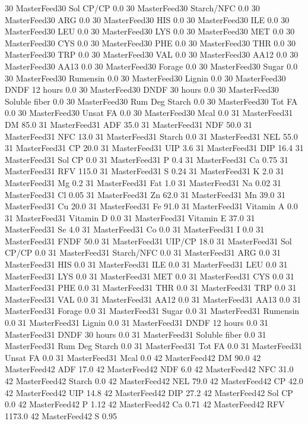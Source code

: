 \documentclass[letterpaper,10pt,english]{sphinxmanual}
\begin{document}
\begin{sphinxVerbatim}[commandchars=\\\{\},numbers=left,firstnumber=1,stepnumber=1]
30 MasterFeed30 Sol CP/CP 0.0
30 MasterFeed30 Starch/NFC 0.0
30 MasterFeed30 ARG 0.0
30 MasterFeed30 HIS 0.0
30 MasterFeed30 ILE 0.0
30 MasterFeed30 LEU 0.0
30 MasterFeed30 LYS 0.0
30 MasterFeed30 MET 0.0
30 MasterFeed30 CYS 0.0
30 MasterFeed30 PHE 0.0
30 MasterFeed30 THR 0.0
30 MasterFeed30 TRP 0.0
30 MasterFeed30 VAL 0.0
30 MasterFeed30 AA\PYGZsh{}12 0.0
30 MasterFeed30 AA\PYGZsh{}13 0.0
30 MasterFeed30 \PYGZpc{} Forage 0.0
30 MasterFeed30 Sugar \PYGZpc{} 0.0
30 MasterFeed30 Rumensin 0.0
30 MasterFeed30 Lignin 0.0
30 MasterFeed30 DNDF 12 hours 0.0
30 MasterFeed30 DNDF 30 hours 0.0
30 MasterFeed30 Soluble fiber 0.0
30 MasterFeed30 Rum Deg Starch 0.0
30 MasterFeed30 Tot FA 0.0
30 MasterFeed30 Unsat FA 0.0
30 MasterFeed30 Mcal 0.0
31 MasterFeed31 DM 85.0
31 MasterFeed31 ADF 35.0
31 MasterFeed31 NDF 50.0
31 MasterFeed31 NFC 13.0
31 MasterFeed31 Starch 0.0
31 MasterFeed31 NEL 55.0
31 MasterFeed31 CP 20.0
31 MasterFeed31 UIP 3.6
31 MasterFeed31 DIP 16.4
31 MasterFeed31 Sol CP 0.0
31 MasterFeed31 P 0.4
31 MasterFeed31 Ca 0.75
31 MasterFeed31 RFV 115.0
31 MasterFeed31 S 0.24
31 MasterFeed31 K 2.0
31 MasterFeed31 Mg 0.2
31 MasterFeed31 Fat 1.0
31 MasterFeed31 Na 0.02
31 MasterFeed31 Cl 0.05
31 MasterFeed31 Zn 62.0
31 MasterFeed31 Mn 39.0
31 MasterFeed31 Cu 20.0
31 MasterFeed31 Fe 91.0
31 MasterFeed31 Vitamin A 0.0
31 MasterFeed31 Vitamin D 0.0
31 MasterFeed31 Vitamin E 37.0
31 MasterFeed31 Se 4.0
31 MasterFeed31 Co 0.0
31 MasterFeed31 I 0.0
31 MasterFeed31 FNDF 50.0
31 MasterFeed31 UIP/CP 18.0
31 MasterFeed31 Sol CP/CP 0.0
31 MasterFeed31 Starch/NFC 0.0
31 MasterFeed31 ARG 0.0
31 MasterFeed31 HIS 0.0
31 MasterFeed31 ILE 0.0
31 MasterFeed31 LEU 0.0
31 MasterFeed31 LYS 0.0
31 MasterFeed31 MET 0.0
31 MasterFeed31 CYS 0.0
31 MasterFeed31 PHE 0.0
31 MasterFeed31 THR 0.0
31 MasterFeed31 TRP 0.0
31 MasterFeed31 VAL 0.0
31 MasterFeed31 AA\PYGZsh{}12 0.0
31 MasterFeed31 AA\PYGZsh{}13 0.0
31 MasterFeed31 \PYGZpc{} Forage 0.0
31 MasterFeed31 Sugar \PYGZpc{} 0.0
31 MasterFeed31 Rumensin 0.0
31 MasterFeed31 Lignin 0.0
31 MasterFeed31 DNDF 12 hours 0.0
31 MasterFeed31 DNDF 30 hours 0.0
31 MasterFeed31 Soluble fiber 0.0
31 MasterFeed31 Rum Deg Starch 0.0
31 MasterFeed31 Tot FA 0.0
31 MasterFeed31 Unsat FA 0.0
31 MasterFeed31 Mcal 0.0
42 MasterFeed42 DM 90.0
42 MasterFeed42 ADF 17.0
42 MasterFeed42 NDF 6.0
42 MasterFeed42 NFC 31.0
42 MasterFeed42 Starch 0.0
42 MasterFeed42 NEL 79.0
42 MasterFeed42 CP 42.0
42 MasterFeed42 UIP 14.8
42 MasterFeed42 DIP 27.2
42 MasterFeed42 Sol CP 0.0
42 MasterFeed42 P 1.12
42 MasterFeed42 Ca 0.71
42 MasterFeed42 RFV 1173.0
42 MasterFeed42 S 0.95

\end{sphinxVerbatim}
\end{document}

